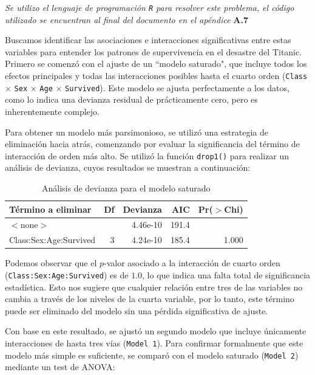 \textit{Se utilizo el lenguaje de programación \texttt{R} para resolver este problema, el código utilizado se encuentran al final del documento en el apéndice} \textbf{A.7}

Buscamos identificar las asociaciones e interacciones significativas entre estas variables para entender los patrones de supervivencia en el desastre del Titanic. Primero se comenzó con el ajuste de un ``modelo saturado", que incluye todos los efectos principales y todas las interacciones posibles hasta el cuarto orden (\texttt{Class} $\times$ \texttt{Sex} $\times$ \texttt{Age} $\times$ \texttt{Survived}). Este modelo se ajusta perfectamente a los datos, como lo indica una devianza residual de prácticamente cero, pero es inherentemente complejo.

Para obtener un modelo más parsimonioso, se utilizó una estrategia de eliminación hacia atrás, comenzando por evaluar la significancia del término de interacción de orden más alto. Se utilizó la función \texttt{drop1()} para realizar un análisis de devianza, cuyos resultados se muestran a continuación:

\begin{table}[H]
\centering
\caption{Análisis de devianza para el modelo saturado}
\label{tab:drop1}
\begin{tabular}{lrrrr}
\toprule
\textbf{Término a eliminar} & \textbf{Df} & \textbf{Devianza} & \textbf{AIC} & \textbf{Pr($>$Chi)} \\
\midrule
$<$none$>$                 &             & 4.46e-10          & 191.4        &                     \\
Class:Sex:Age:Survived      & 3           & 4.24e-10          & 185.4        & 1.000               \\
\bottomrule
\end{tabular}
\end{table}

Podemos observar que el $p$-valor asociado a la interacción de cuarto orden (\texttt{Class:Sex:Age:Survived}) es de $1.0$, lo que indica una falta total de significancia estadística. Esto nos sugiere que cualquier relación entre tres de las variables no cambia a través de los niveles de la cuarta variable, por lo tanto, este término puede ser eliminado del modelo sin una pérdida significativa de ajuste.

Con base en este resultado, se ajustó un segundo modelo que incluye únicamente interacciones de hasta tres vías (\texttt{Model 1}). Para confirmar formalmente que este modelo más simple es suficiente, se comparó con el modelo saturado (\texttt{Model 2}) mediante un test de ANOVA:

